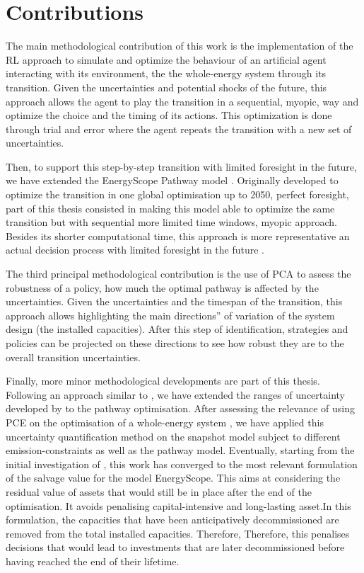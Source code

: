 \section*{Contributions}
\label{sec:meth:contributions}
The main methodological contribution of this work is the implementation of the \gls{RL} approach to simulate and optimize the behaviour of an artificial agent interacting with its environment, \ie the the whole-energy system through its transition. Given the uncertainties and potential shocks of the future, this approach allows the agent to play the transition in a sequential, \ie myopic, way and optimize the choice and the timing of its actions. This optimization is done through trial and error where the agent repeats the transition with a new set of uncertainties. 

Then, to support this step-by-step transition with limited foresight in the future, we have extended the EnergyScope Pathway model \cite{limpens2021generating}. Originally developed to optimize the transition in one global optimisation up to 2050, \ie perfect foresight, part of this thesis consisted in making this model able to optimize the same transition but with sequential more limited time windows, \ie myopic approach. Besides its shorter computational time, this approach is more representative an actual decision process with limited foresight in the future \cite{babrowski2014reducing}.

The third principal methodological contribution is the use of \acrfull{PCA} to assess the robustness of a policy, \ie how much the optimal pathway is affected by the uncertainties. Given the uncertainties and the timespan of the transition, this approach allows highlighting the main \og directions'' of variation of the system design (\ie the installed capacities). After this step of identification, strategies and policies can be projected on these directions to see how robust they are to the overall transition uncertainties.

Finally, more minor methodological developments are part of this thesis. Following an approach similar to \citet{guevara2022modeling}, we have extended the ranges of uncertainty developed by \citet{Moret2017} to the pathway optimisation. After assessing the relevance of using \acrfull{PCE} on the optimisation of a whole-energy system \cite{limpens2020impact}, we have applied this uncertainty quantification method on the snapshot model subject to different emission-constraints \citet{rixhon2021role} as well as the pathway model. Eventually, starting from the initial investigation of \citet{goffauxpathway}, this work has converged to the most relevant formulation of the salvage value for the model EnergyScope. This aims at considering the residual value of assets that would still be in place after the end of the optimisation. It avoids penalising capital-intensive and long-lasting asset.In this formulation, the capacities that have been anticipatively decommissioned are removed from the total installed capacities. Therefore,  Therefore, this penalises decisions that would lead to investments that are later decommissioned before having reached the end of their lifetime.

